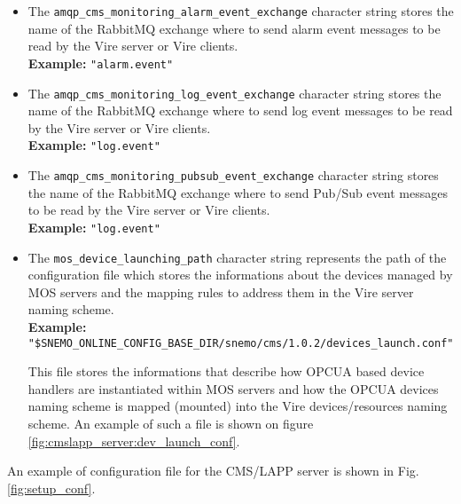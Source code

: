 \begin{itemize}
\item      The     \texttt{amqp\_cms\_monitoring\_alarm\_event\_exchange}
  character string stores the name of  the RabbitMQ exchange where to send
  alarm event messages to be read by the Vire server or Vire clients.\\
  \noindent \textbf{Example:} \texttt{"alarm.event"}

\item      The     \texttt{amqp\_cms\_monitoring\_log\_event\_exchange}
  character string stores the name of  the RabbitMQ exchange where to send
  log event messages to be read by the Vire server or Vire clients.\\
  \noindent \textbf{Example:} \texttt{"log.event"}

\item      The     \texttt{amqp\_cms\_monitoring\_pubsub\_event\_exchange}
  character string stores the name of  the RabbitMQ exchange where to send
  Pub/Sub event messages to be read by the Vire server or Vire clients.\\
  \noindent \textbf{Example:} \texttt{"log.event"}



\item   The  \texttt{mos\_device\_launching\_path}   character  string
  represents  the path  of  the configuration  file  which stores  the
  informations  about  the devices  managed  by  MOS servers  and  the
  mapping rules to address them in  the Vire server naming scheme. \\
  \noindent \textbf{Example:} \texttt{"\${SNEMO\_ONLINE\_CONFIG\_BASE\_DIR}/snemo/cms/1.0.2/devices\_launch.conf"}

  This  file stores  the informations  that describe  how OPCUA  based
  device  handlers are  instantiated within  MOS servers  and how  the
  OPCUA  devices  naming scheme  is  mapped  (mounted) into  the  Vire
  devices/resources naming scheme. An example  of such a file is shown
  on figure \ref{fig:cmslapp_server:dev_launch_conf}.

\end{itemize}

\vskip 10pt
\noindent An example of configuration  file for the CMS/LAPP server is
shown in Fig. \ref{fig:setup_conf}.

